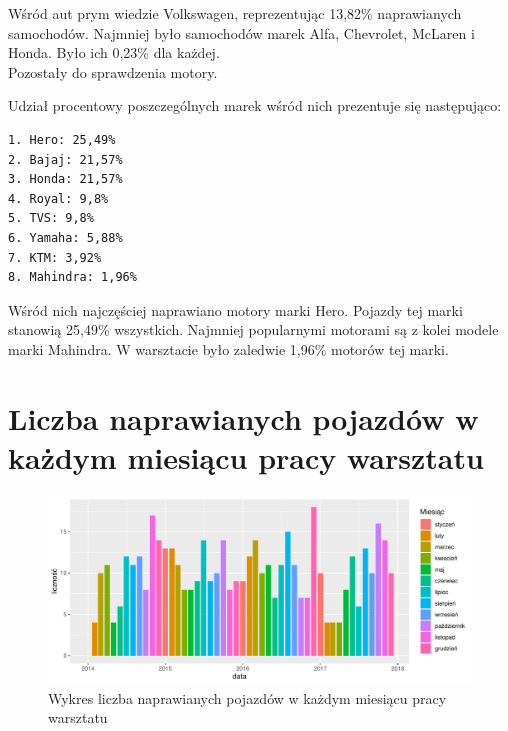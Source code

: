 \documentclass{article}\usepackage[]{graphicx}\usepackage[]{xcolor}
\makeatletter
\def\maxwidth{ %
  \ifdim\Gin@nat@width>\linewidth
    \linewidth
  \else
    \Gin@nat@width
  \fi
}
\newenvironment{knitrout}{}{} %
\makeatother
\begin{document}
Wśród aut prym wiedzie Volkswagen, reprezentując  13,82\% naprawianych samochodów. Najmniej było samochodów marek Alfa, Chevrolet, McLaren i Honda. Było ich 0,23\% dla każdej. \\

Pozostały do sprawdzenia motory.



Udział procentowy poszczególnych marek wśród nich prezentuje się następująco:

\begin{verbatim}
1. Hero: 25,49%
2. Bajaj: 21,57%
3. Honda: 21,57%
4. Royal: 9,8%
5. TVS: 9,8%
6. Yamaha: 5,88%
7. KTM: 3,92%
8. Mahindra: 1,96%
\end{verbatim}

Wśród nich najczęściej naprawiano motory marki Hero. Pojazdy tej marki stanowią 25,49\% wszystkich. Najmniej popularnymi motorami są z kolei modele marki Mahindra. W warsztacie było zaledwie 1,96\% motorów tej marki.

\section{Liczba naprawianych pojazdów w każdym miesiącu pracy warsztatu}

\begin{knitrout}
\color{fgcolor}\begin{figure}[H]

{\centering \includegraphics[width=\maxwidth]{figure/fig_naprawy_miesiecznie-1} 

}

\caption[Wykres liczba naprawianych pojazdów w każdym miesiącu pracy warsztatu]{Wykres liczba naprawianych pojazdów w każdym miesiącu pracy warsztatu}\label{fig:fig_naprawy_miesiecznie}
\end{figure}

\end{knitrout}
\end{document}
